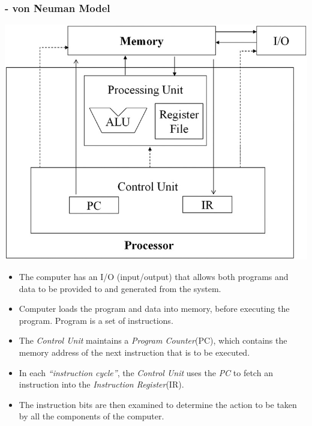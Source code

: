 \subsubsection{- von Neuman Model}
\begin{center}
    \includegraphics[width=0.4\linewidth]{Images/CompArch/neuman.png}
\end{center}
\begin{itemize}
    \item The computer has an I/O (input/output) that allows both programs and data to be provided to and generated from the system.
    \item Computer loads the program and data into memory, before executing the program. Program is a set of instructions.
    \item The \textsl{Control Unit} maintains a \textsl{Program Counter}(PC), which contains the memory address of the next instruction that is to be executed.
    \item In each \textsl{\enquote{instruction cycle}}, the \textsl{Control Unit} uses the \textsl{PC} to fetch an instruction into the \textsl{Instruction Register}(IR).
    \item The instruction bits are then examined to determine the action to be taken by all the components of the computer.
\end{itemize}

